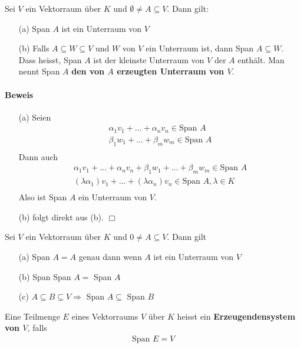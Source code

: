 \documentclass[11pt]{report}
\newcommand*\f[1] {\textbf{#1}}
\begin{document}
\begin{lemma}
 \label{lemma322}
 Sei $V$ ein Vektorraum über $K$ und $\emptyset \neq A \subseteq V$. Dann gilt:
\begin{itemize}
 \item[(a)] Span $A$ ist ein Unterraum von $V$
 \item[(b)] Falls $A \subseteq W \subseteq V$ und $W$ von $V$ ein Unterraum ist, dann Span $A \subseteq W$. Dass heisst, Span $A$ ist der kleinste Unterraum von $V$ der $A$ enthält. Man nennt Span $A$ \f{den von $A$ erzeugten Unterraum von $V$}.
\end{itemize}
\end{lemma}

\paragraph{Beweis} 
\begin{itemize}
 \item[(a)] Seien
\begin{align}
 \alpha_1 v_1 + ... + \alpha_n v_n \in \text{Span } A \\
 \beta_1 w_1 + ... + \beta_m w_m \in \text{Span } A \\
\end{align}
Dann auch
\begin{align}
 \alpha_1 v_1 + ... + \alpha_n v_n +\beta_1 w_1 + ... + \beta_m w_m \in \text{Span } A \\
 (\lambda \alpha_1) v_1 + ... + (\lambda \alpha_n) v_n \in \text{Span } A, \lambda \in K \\
\end{align}
Also ist Span $A$ ein Unterraum von $V$.
\item[(b)] folgt direkt aus (b). \hfill $\Box$
\end{itemize}
\newpage
\begin{korollar}
 \label{korollar323}
 Sei $V$ ein Vektorraum über $K$ und $0 \neq A \subseteq V$. Dann gilt
\begin{itemize}
 \item[(a)] Span $A = A$ genau dann wenn $A$ ist ein Unterraum von $V$
 \item[(b)] Span Span $A = $ Span $A$
 \item[(c)] $A \subseteq B \subseteq V \Rightarrow$ Span $A \subseteq$ Span $B$
\end{itemize}
\end{korollar}
\vspace*{0.4cm}
Eine Teilmenge $E$ eines Vektorraums $V$ über $K$ heisst ein \f{Erzeugendensystem von $V$}, falls
\begin{align}
 \text{Span } E = V
\end{align}
\end{document}

